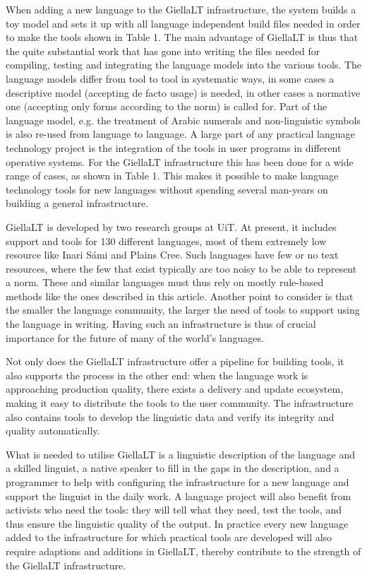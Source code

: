 \documentclass[free]{flammie}
\begin{document}
When adding a new language to the GiellaLT infrastructure, the system builds a toy
model and sets it up with all language independent build files needed in order to make the
tools shown in Table 1. The main advantage of GiellaLT is thus that the quite substantial
work that has gone into writing the files needed for compiling, testing and integrating the
language models into the various tools. The language models differ from tool to tool in
systematic ways, in some cases a descriptive model (accepting de facto usage) is needed,
in other cases a normative one (accepting only forms according to the norm) is called for.
Part of the language model, e.g. the treatment of Arabic numerals and non-linguistic symbols is also re-used from language to language. A large part of any practical language technology project is the integration of the tools in user programs in different operative systems.
For the GiellaLT infrastructure this has been done for a wide range of cases, as shown in
Table 1. This makes it possible to make language technology tools for new languages without spending several man-years on building a general infrastructure.

GiellaLT is developed by two research groups at UiT. At present, it includes support
and tools for 130 different languages, most of them extremely low resource like Inari Sámi
and Plains Cree. Such languages have few or no text resources, where the few that exist
typically are too noisy to be able to represent a norm. These and similar languages must
thus rely on mostly rule-based methods like the ones described in this article. Another point
to consider is that the smaller the language community, the larger the need of tools to
support using the language in writing. Having such an infrastructure is thus of crucial importance for the future of many of the world’s languages.

Not only does the GiellaLT infrastructure offer a pipeline for building tools, it also supports the process in the other end: when the language work is approaching production quality, there exists a delivery and update ecosystem, making it easy to distribute the tools to
the user community. The infrastructure also contains tools to develop the linguistic data
and verify its integrity and quality automatically.

What is needed to utilise GiellaLT is a linguistic description of the language and a
skilled linguist, a native speaker to fill in the gaps in the description, and a programmer to
help with configuring the infrastructure for a new language and support the linguist in the
daily work. A language project will also benefit from activists who need the tools: they will
tell what they need, test the tools, and thus ensure the linguistic quality of the output. In
practice every new language added to the infrastructure for which practical tools are developed will also require adaptions and additions in GiellaLT, thereby contribute to the
strength of the GiellaLT infrastructure.
\end{document}
